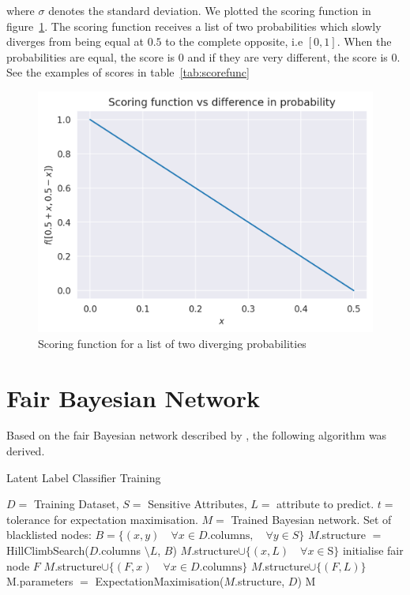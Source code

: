 where $\sigma$ denotes the standard deviation. We plotted the scoring function in figure~\ref{fig:scorefunc}. The scoring function receives a list of two probabilities which slowly diverges from being equal at $0.5$ to the complete opposite, i.e $[0, 1]$. When the probabilities are equal, the score is 0 and if they are very different, the score is 0. See the examples of scores in table~\ref{tab:scorefunc}

\begin{figure}
    \centering
    \includegraphics[width=0.7\linewidth]{figures/Parity_metric.png}
    \caption{Scoring function for a list of two diverging probabilities}
    \label{fig:scorefunc}
\end{figure}

\section{Fair Bayesian Network}
\label{sec:fairbayesiannetwork}
Based on the fair Bayesian network described by \citet{Choi:2021:AIII}, the following algorithm was derived.

\begin{algorithm}
    \caption{Latent Label Classifier Training}
    \begin{algorithmic}
        \REQUIRE $D = $ Training Dataset, $S = $ Sensitive Attributes, $L = $ attribute to predict. $t = $ tolerance for expectation maximisation.
        \ENSURE $M = $ Trained Bayesian network.
        \STATE Set of blacklisted nodes: $B = \{(x, y) \quad \forall x \in D.\text{columns}, \quad \forall y \in S\}$
        \STATE $M$.structure $=$ HillClimbSearch($D.$columns $\setminus L$, $B$)
        \STATE $M.$structure$ \cup \{ (x, L) \quad \forall x \in $S$\}$
        \STATE initialise fair node $F$
        \STATE $M.$structure$ \cup \{ (F, x) \quad \forall x \in D.\text{columns}\}$
        \STATE $M.$structure$ \cup \{ (F, L)\}$
        \STATE M.parameters $=$ ExpectationMaximisation($M$.structure, $D$)
        \RETURN M 
    \end{algorithmic}
\end{algorithm}

